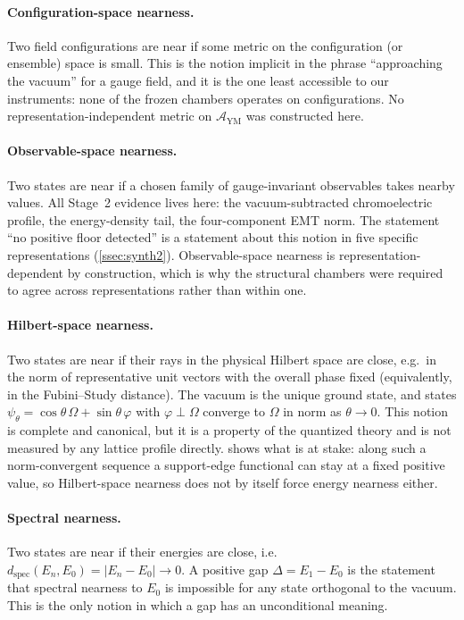 \documentclass[11pt,a4paper]{article}
\theoremstyle{definition}
\theoremstyle{remark}
\newcommand{\dspec}{d_{\mathrm{spec}}}
\newcommand{\AYM}{\mathcal{A}_{\mathrm{YM}}}
\begin{document}
\paragraph{Configuration-space nearness.} Two field configurations are near if some metric on the configuration (or ensemble) space is small. This is the notion implicit in the phrase ``approaching the vacuum'' for a gauge field, and it is the one least accessible to our instruments: none of the frozen chambers operates on configurations. No representation-independent metric on $\AYM$ was constructed here.

\paragraph{Observable-space nearness.} Two states are near if a chosen family of gauge-invariant observables takes nearby values. All Stage~2 evidence lives here: the vacuum-subtracted chromoelectric profile, the energy-density tail, the four-component EMT norm. The statement ``no positive floor detected'' is a statement about this notion in five specific representations (\cref{ssec:synth2}). Observable-space nearness is representation-dependent by construction, which is why the structural chambers were required to agree across representations rather than within one.

\paragraph{Hilbert-space nearness.} Two states are near if their rays in the physical Hilbert space are close, e.g.\ in the norm of representative unit vectors with the overall phase fixed (equivalently, in the Fubini--Study distance). The vacuum is the unique ground state, and states $\psi_\theta=\cos\theta\,\Omega+\sin\theta\,\varphi$ with $\varphi\perp\Omega$ converge to $\Omega$ in norm as $\theta\to0$. This notion is complete and canonical, but it is a property of the quantized theory and is not measured by any lattice profile directly.  shows what is at stake: along such a norm-convergent sequence a support-edge functional can stay at a fixed positive value, so Hilbert-space nearness does not by itself force energy nearness either.

\paragraph{Spectral nearness.} Two states are near if their energies are close, i.e.\ $\dspec(E_n,E_0)=|E_n-E_0|\to0$. A positive gap $\Delta=E_1-E_0$ is the statement that spectral nearness to $E_0$ is impossible for any state orthogonal to the vacuum. This is the only notion in which a gap has an unconditional meaning.
\end{document}
